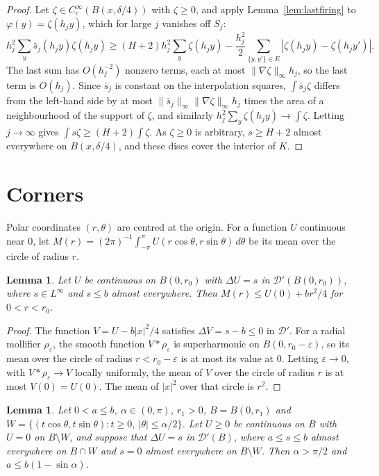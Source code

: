 \documentclass[11pt]{amsart}
\newtheorem{lemma}[theorem]{Lemma}
\theoremstyle{remark}
\numberwithin{equation}{section}
\newcommand{\D}{\mathcal D}
\begin{document}
\begin{proof}
Let $\zeta\in C_c^\infty(B(x,\delta/4))$ with $\zeta\ge0$, and apply Lemma~\ref{lem:lastfiring} to $\varphi(y)=\zeta(h_jy)$, which for large $j$ vanishes off $S_j$:
\[
h_j^2\sum_{y}\bar s_j(h_jy)\zeta(h_jy)\ge(H+2)h_j^2\sum_y\zeta(h_jy)-\frac{h_j^2}2\sum_{\{y,y'\}\in E}|\zeta(h_jy)-\zeta(h_jy')|.
\]
The last sum has $O(h_j^{-2})$ nonzero terms, each at most $\|\nabla\zeta\|_\infty h_j$, so the last term is $O(h_j)$. Since $\bar s_j$ is constant on the interpolation squares, $\int\bar s_j\zeta$ differs from the left-hand side by at most $\|\bar s_j\|_\infty\|\nabla\zeta\|_\infty h_j$ times the area of a neighbourhood of the support of $\zeta$, and similarly $h_j^2\sum_y\zeta(h_jy)\to\int\zeta$. Letting $j\to\infty$ gives $\int s\zeta\ge(H+2)\int\zeta$. As $\zeta\ge0$ is arbitrary, $s\ge H+2$ almost everywhere on $B(x,\delta/4)$, and these discs cover the interior of $K$.
\end{proof}

\section{Corners}\label{sec:corners}

Polar coordinates $(r,\theta)$ are centred at the origin. For a function $U$ continuous near $0$, let $M(r)=(2\pi)^{-1}\int_{-\pi}^{\pi}U(r\cos\theta,r\sin\theta)\,d\theta$ be its mean over the circle of radius $r$.

\begin{lemma}\label{lem:mean}
Let $U$ be continuous on $B(0,r_0)$ with $\Delta U=s$ in $\D'(B(0,r_0))$, where $s\in L^\infty$ and $s\le b$ almost everywhere. Then $M(r)\le U(0)+br^2/4$ for $0<r<r_0$.
\end{lemma}

\begin{proof}
The function $V=U-b|x|^2/4$ satisfies $\Delta V=s-b\le0$ in $\D'$. For a radial mollifier $\rho_\varepsilon$, the smooth function $V*\rho_\varepsilon$ is superharmonic on $B(0,r_0-\varepsilon)$, so its mean over the circle of radius $r<r_0-\varepsilon$ is at most its value at $0$. Letting $\varepsilon\to0$, with $V*\rho_\varepsilon\to V$ locally uniformly, the mean of $V$ over the circle of radius $r$ is at most $V(0)=U(0)$. The mean of $|x|^2$ over that circle is $r^2$.
\end{proof}

\begin{lemma}\label{lem:corner}
Let $0<a\le b$, $\alpha\in(0,\pi)$, $r_1>0$, $B=B(0,r_1)$ and $W=\{(t\cos\theta,t\sin\theta):t\ge0,\ |\theta|\le\alpha/2\}$. Let $U\ge0$ be continuous on $B$ with $U=0$ on $B\setminus W$, and suppose that $\Delta U=s$ in $\D'(B)$, where $a\le s\le b$ almost everywhere on $B\cap W$ and $s=0$ almost everywhere on $B\setminus W$. Then $\alpha>\pi/2$ and $a\le b(1-\sin\alpha)$.
\end{lemma}
\end{document}
